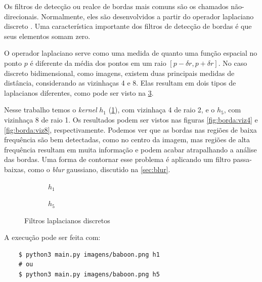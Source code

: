 Os filtros de detecção ou realce de bordas mais comuns são os chamados não-direcionais. Normalmente, eles são desenvolvidos a partir do operador laplaciano discreto \autocite{ref:laplacian}. Uma característica importante dos filtros de detecção de bordas é que seus elementos somam zero.

O operador laplaciano serve como uma medida de quanto uma função espacial no ponto $p$ é diferente da média dos pontos em um raio $[p - \delta r, p + \delta r]$. No caso discreto bidimensional, como imagens, existem duas principais medidas de distância, considerando as vizinhaças 4 e 8. Elas resultam em dois tipos de laplacianos diferentes, como pode ser visto na \cref{fig:borda:kernel}.

Nesse trabalho temos o \textit{kernel} $h_1$ (\ref{fig:h1}), com vizinhaça 4 de raio 2, e o $h_5$, com vizinhaça 8 de raio 1. Os resultados podem ser vistos nas figuras \ref{fig:borda:viz4} e \ref{fig:borda:viz8}, respectivamente. Podemos ver que as bordas nas regiões de baixa frequência são bem detectadas, como no centro da imagem, mas regiões de alta frequência resultam em muita informação e podem acabar atrapalhando a análise das bordas. Uma forma de contornar esse problema é aplicando um filtro passa-baixas, como o \textit{blur} gaussiano, discutido na \cref{sec:blur}.

\begin{figure}[H]
    \centering
    \begin{subfigure}{0.4\textwidth}
        \centering
        
        \caption{~$h_1$}
        \label{fig:h1}
    \end{subfigure}%
    \begin{subfigure}{0.4\textwidth}
        \centering
        
        \caption{~$h_5$}
        \label{fig:h5}
    \end{subfigure}

    \caption{Filtros laplacianos discretos}
    \label{fig:borda:kernel}
\end{figure}

A execução pode ser feita com:

\begin{verbatim}
    $ python3 main.py imagens/baboon.png h1
    # ou
    $ python3 main.py imagens/baboon.png h5
\end{verbatim}
